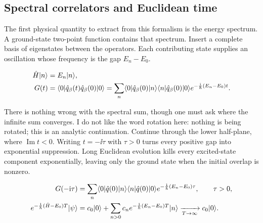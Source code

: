 \subsection{Spectral correlators and Euclidean time}

The first physical quantity to extract from this formalism is the energy spectrum. A ground-state two-point function contains that spectrum. Insert a complete basis of eigenstates between the operators. Each contributing state supplies an oscillation whose frequency is the gap $E_n-E_0$.

\begin{align}
  \hat H\lvert n\rangle&=E_n\lvert n\rangle,
  \label{eq:253a-ch02-energy-eigenstates}\\
  G(t)&=\langle 0\rvert\hat q_\beta(t)\hat q_\beta(0)\lvert 0\rangle
  =\sum_n\langle 0\rvert\hat q_\beta(0)\lvert n\rangle
  \langle n\rvert\hat q_\beta(0)\lvert 0\rangle
  e^{-\frac{\mathrm{i}}{\hbar}(E_n-E_0)t}.
  \label{eq:253a-ch02-spectral-correlator}
\end{align}

There is nothing wrong with the spectral sum, though one must ask where the infinite sum converges. I do not like the word rotation here: nothing is being rotated; this is an analytic continuation. Continue through the lower half-plane, where $\operatorname{Im}t<0$. Writing $t=-\ii\tau$ with $\tau>0$ turns every positive gap into exponential suppression. Long Euclidean evolution kills every excited-state component exponentially, leaving only the ground state when the initial overlap is nonzero.

\begin{align}
  G(-\mathrm{i}\tau)
  &=\sum_n\langle 0\rvert\hat q(0)\lvert n\rangle\langle n\rvert\hat q(0)\lvert 0\rangle
  e^{-\frac{1}{\hbar}(E_n-E_0)\tau},
  \qquad \tau>0,
  \label{eq:253a-ch02-euclidean-spectral-correlator}\\
  e^{-\frac{1}{\hbar}(\hat H-E_0)T}\lvert \psi\rangle
  &=c_0\lvert 0\rangle+\sum_{n>0}c_n
  e^{-\frac{1}{\hbar}(E_n-E_0)T}\lvert n\rangle
  \xrightarrow[T\to\infty]{}c_0\lvert 0\rangle.
  \label{eq:253a-ch02-ground-state-projection}
\end{align}

